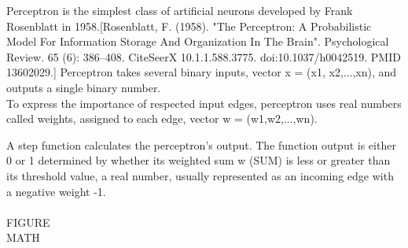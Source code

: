Perceptron is the simplest class of artificial neurons developed by Frank Rosenblatt in 1958.[Rosenblatt, F. (1958). "The Perceptron: A Probabilistic Model For Information Storage And Organization In The Brain". Psychological Review. 65 (6): 386–408. CiteSeerX 10.1.1.588.3775. doi:10.1037/h0042519. PMID 13602029.]
Perceptron takes several binary inputs, vector x = (x1, x2,...,xn), and outputs a single binary number. \\
To express the importance of respected input edges, perceptron uses real numbers called weights,
 assigned to each edge, vector w = (w1,w2,...,wn).

A step function calculates the perceptron's output.
The function output is either 0 or 1 determined by whether its weighted sum w (SUM) is less or greater than its threshold value,
 a real number, usually represented as an incoming edge with a negative weight -1. \\
 \\
 FIGURE \\
 MATH \\
